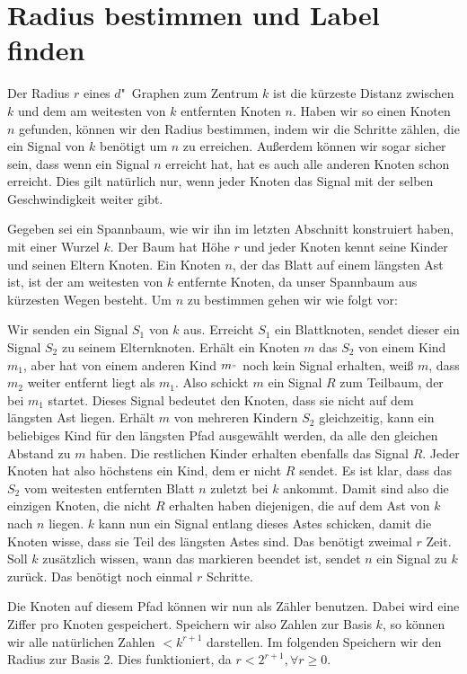 \documentclass[11pt]{article}
\begin{document}
\section{Radius bestimmen und Label finden}
Der Radius $r$ eines $d$"~Graphen zum Zentrum $k$ ist die kürzeste Distanz zwischen $k$ und dem am weitesten von $k$ entfernten Knoten $n$. 
Haben wir so einen Knoten $n$ gefunden, können wir den Radius bestimmen, indem wir die Schritte zählen, die ein Signal von $k$ benötigt um $n$ zu erreichen. 
Außerdem können wir sogar sicher sein, dass wenn ein Signal $n$ erreicht hat, hat es auch alle anderen Knoten schon erreicht. 
Dies gilt natürlich nur, wenn jeder Knoten das Signal mit der selben Geschwindigkeit weiter gibt.

Gegeben sei ein Spannbaum, wie wir ihn im letzten Abschnitt konstruiert haben, mit einer Wurzel $k$. 
Der Baum hat Höhe $r$ und jeder Knoten kennt seine Kinder und seinen Eltern Knoten. 
Ein Knoten $n$, der das Blatt auf einem längsten Ast ist, ist der am weitesten von $k$ entfernte Knoten, da unser Spannbaum aus kürzesten Wegen besteht. 
Um $n$ zu bestimmen gehen wir wie folgt vor:

Wir senden ein Signal $S_1$ von $k$ aus. Erreicht $S_1$ ein Blattknoten, sendet dieser ein Signal $S_2$ zu seinem Elternknoten. Erhält ein Knoten $m$ das $S_2$ von einem Kind $m_1$, aber hat von einem anderen Kind $m_"$ noch kein Signal erhalten, weiß $m$, dass $m_2$ weiter entfernt liegt als $m_1$. 
Also schickt $m$ ein Signal $R$ zum Teilbaum, der bei $m_1$ startet. Dieses Signal bedeutet den Knoten, dass sie nicht auf dem längsten Ast liegen. 
Erhält $m$  von mehreren Kindern $S_2$ gleichzeitig, kann ein beliebiges Kind für den längsten Pfad ausgewählt werden, da alle den gleichen Abstand zu $m$ haben. 
Die restlichen Kinder erhalten ebenfalls das Signal $R$. 
Jeder Knoten hat also höchstens ein Kind, dem er nicht $R$ sendet. 
Es ist klar, dass das $S_2$ vom weitesten entfernten Blatt $n$ zuletzt bei $k$ ankommt. 
Damit sind also die einzigen Knoten, die nicht $R$ erhalten haben diejenigen, die auf dem Ast von $k$ nach $n$ liegen.
$k$ kann nun ein Signal entlang dieses Astes schicken, damit die Knoten wisse, dass sie Teil des längsten Astes sind.
Das benötigt zweimal $r$ Zeit. Soll $k$ zusätzlich wissen, wann das markieren beendet ist, sendet $n$ ein Signal zu $k$ zurück. Das benötigt noch einmal $r$ Schritte.

Die Knoten auf diesem Pfad können wir nun als Zähler benutzen.
Dabei wird eine Ziffer pro Knoten gespeichert. Speichern wir also Zahlen zur Basis $k$, so können wir alle natürlichen Zahlen $< k^{r+1}$ darstellen. Im folgenden Speichern wir den Radius zur Basis 2. Dies funktioniert, da $r < 2^{r+1} , \forall r \geq 0$.
\end{document}
